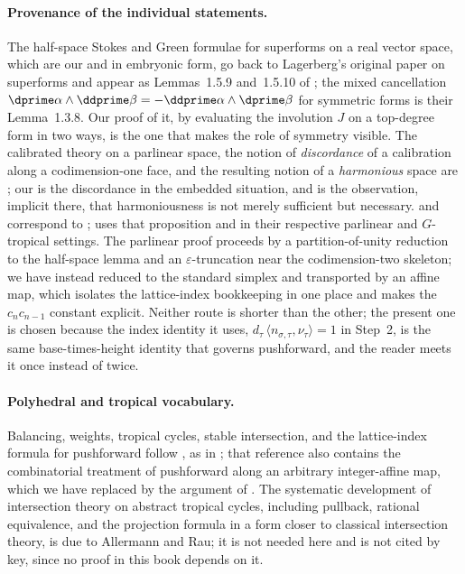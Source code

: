 \paragraph{Provenance of the individual statements.}
The half-space Stokes and Green formulae for superforms on a real vector
space, which are our  and
 in embryonic form, go back to Lagerberg's
original paper on superforms and appear as Lemmas~1.5.9 and~1.5.10 of
\cite{CLD25}; the mixed cancellation
$\dprime\alpha\wedge\ddprime\beta=-\ddprime\alpha\wedge\dprime\beta$ for
symmetric forms is their Lemma~1.3.8.  Our proof of it, by evaluating the
involution $J$ on a top-degree form in two ways, is the one that makes the
role of symmetry visible.  The calibrated theory on a parlinear space, the
notion of \emph{discordance} of a calibration along a codimension-one face,
and the resulting notion of a \emph{harmonious} space are
\cite[\S\S4.6.7--4.6.14]{CLD25}; our  is the
discordance in the embedded situation, and
 is the observation, implicit there,
that harmoniousness is not merely sufficient but necessary.
 and  correspond to
\cite[Proposition~4.6.15]{CLD25};  uses that
proposition and \cite[Proposition~5.11.1]{CLD25} in their respective
parlinear and $G$-tropical settings.  The parlinear proof proceeds by a
partition-of-unity reduction to the half-space lemma and an
$\varepsilon$-truncation near the codimension-two skeleton; we have instead
reduced to the standard simplex and transported by an affine map, which
isolates the lattice-index bookkeeping in one place and makes the
$c_nc_{n-1}$ constant explicit.  Neither route is shorter than the other; the
present one is chosen because the index identity it uses,
$d_\tau\,\langle n_{\sigma,\tau},\nu_\tau\rangle=1$ in Step~2, is the same
base-times-height identity that governs pushforward, and the reader meets it
once instead of twice.

\paragraph{Polyhedral and tropical vocabulary.}
Balancing, weights, tropical cycles, stable intersection, and the
lattice-index formula for pushforward follow
\cite[\S\S4.2--4.3 and 4.6]{MR18Tropical}, as in
; that reference also contains the combinatorial
treatment of pushforward along an arbitrary integer-affine map, which we
have replaced by the argument of
.  The systematic development of
intersection theory on abstract tropical cycles, including pullback,
rational equivalence, and the projection formula in a form closer to
classical intersection theory, is due to Allermann and Rau; it is not needed
here and is not cited by key, since no proof in this book depends on it.

